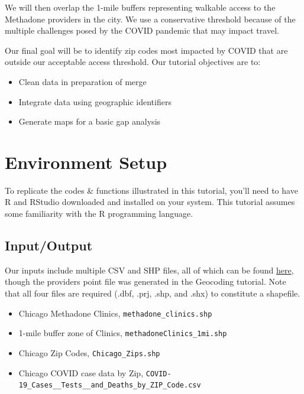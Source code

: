 \documentclass[
  letterpaper,
  DIV=11,
  numbers=noendperiod]{scrreprt}
\providecommand{\tightlist}{%
  \setlength{\itemsep}{0pt}\setlength{\parskip}{0pt}}
\begin{document}
We will then overlap the 1-mile buffers representing walkable access to
the Methadone providers in the city. We use a conservative threshold
because of the multiple challenges posed by the COVID pandemic that may
impact travel.

Our final goal will be to identify zip codes most impacted by COVID that
are outside our acceptable access threshold. Our tutorial objectives are
to:

\begin{itemize}
\tightlist
\item
  Clean data in preparation of merge
\item
  Integrate data using geographic identifiers
\item
  Generate maps for a basic gap analysis
\end{itemize}

\section{Environment Setup}\label{environment-setup}

To replicate the codes \& functions illustrated in this tutorial, you'll
need to have R and RStudio downloaded and installed on your system. This
tutorial assumes some familiarity with the R programming language.

\subsection{Input/Output}\label{BA-i-o}

Our inputs include multiple CSV and SHP files, all of which can be found
\href{https://github.com/GeoDaCenter/opioid-environment-toolkit/tree/master/data}{here},
though the providers point file was generated in the Geocoding tutorial.
Note that all four files are required (.dbf, .prj, .shp, and .shx) to
constitute a shapefile.

\begin{itemize}
\tightlist
\item
  Chicago Methadone Clinics, \texttt{methadone\_clinics.shp}
\item
  1-mile buffer zone of Clinics, \texttt{methadoneClinics\_1mi.shp}
\item
  Chicago Zip Codes, \texttt{Chicago\_Zips.shp}
\item
  Chicago COVID case data by Zip,
  \texttt{COVID-19\_Cases\_\_Tests\_\_and\_Deaths\_by\_ZIP\_Code.csv}
\end{itemize}
\end{document}
